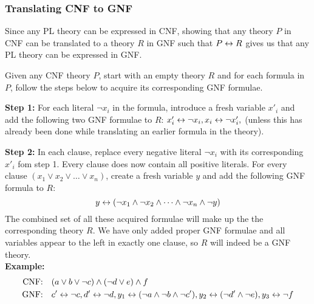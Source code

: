 \subsubsection{Translating CNF to GNF}
\label{subs:Translating CNF to GNF}
Since any PL theory can be expressed in CNF, showing that any theory $P$ in CNF can be translated to a theory $R$ in GNF such that $P \leftrightarrow R$ gives us that any PL theory can be expressed in GNF.

Given any CNF theory $P$, start with an empty theory $R$ and for each formula in $P$, follow the steps below to acquire its corresponding GNF formulae.

\textbf{Step 1:}
For each literal $\neg x_i$ in the formula, introduce a fresh variable $x'_i$ and add the following two GNF formulae to $R$: $x'_i \leftrightarrow \neg x_i, x_i \leftrightarrow \neg x'_i,$ (unless this has already been done while translating an earlier formula in the theory).

\textbf{Step 2:}
In each clause, replace every negative literal $\neg x_i$ with its corresponding $x'_i$ fom step 1. Every clause does now contain all positive literals.
For every clause $(x_1 \vee x_2 \vee \dots \vee x_n)$, create a fresh variable $y$ and add the following GNF formula to $R$:
\[y \leftrightarrow (\neg x_1 \wedge \neg x_2 \wedge \dots \wedge \neg x_n \wedge \neg y)\]
The combined set of all these acquired formulae will make up the the corresponding theory $R$.
We have only added proper GNF formulae and all variables appear to the left in exactly one clause, so $R$ will indeed be a GNF theory.\\

\textbf{Example: }
\begin{align}
  \text{CNF:\quad}& (a \vee b \vee \neg c) \wedge (\neg d \vee e) \wedge f\\
  \text{GNF:\quad}& c' \leftrightarrow \neg c, d' \leftrightarrow \neg d, y_1 \leftrightarrow (\neg a \wedge \neg b \wedge \neg c'), y_2 \leftrightarrow (\neg d' \wedge \neg e), y_3 \leftrightarrow \neg f
\end{align}
